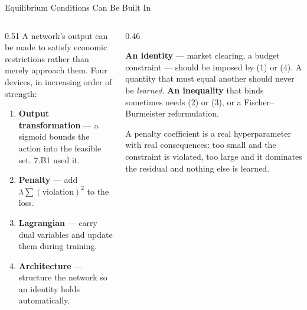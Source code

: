 \begin{frame}{Equilibrium Conditions Can Be Built In}
\begin{columns}[T]
\begin{column}{0.51\textwidth}
\small
A network's output can be made to satisfy economic restrictions rather than merely approach them. Four devices, in increasing order of strength:
\medskip
\begin{enumerate}\small\setlength{\itemsep}{1mm}
  \item \textbf{Output transformation} --- a sigmoid bounds the action into the feasible set. 7.B1 used it.
  \item \textbf{Penalty} --- add $\lambda\sum(\text{violation})^{2}$ to the loss.
  \item \textbf{Lagrangian} --- carry dual variables and update them during training.
  \item \textbf{Architecture} --- structure the network so an identity holds automatically.
\end{enumerate}
\end{column}
\begin{column}{0.46\textwidth}
\begin{takeawaybox}[title=\textbf{Which to reach for}]\small
\textbf{An identity} --- market clearing, a budget constraint --- should be imposed by (1) or (4). A quantity that must equal another should never be \emph{learned}.
\medskip
\textbf{An inequality} that binds sometimes needs (2) or (3), or a Fischer--Burmeister reformulation.
\end{takeawaybox}
\medskip
\begin{cautionbox}\footnotesize
A penalty coefficient is a real hyperparameter with real consequences: too small and the constraint is violated, too large and it dominates the residual and nothing else is learned.
\end{cautionbox}
\end{column}
\end{columns}
\vspace{1mm}
\end{frame}

